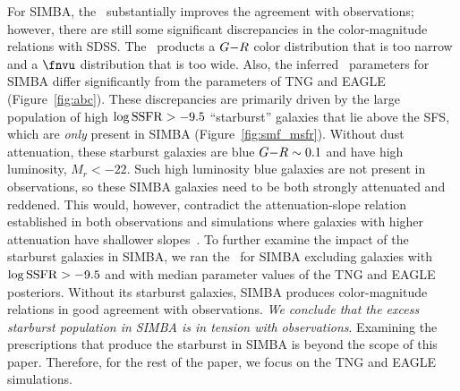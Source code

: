 For SIMBA, the \eda~substantially improves the agreement with observations;
however, there are still some significant discrepancies in the color-magnitude
relations with SDSS. The \eda~products a $G{-}R$ color distribution that is too
narrow and a $\fnvu$ distribution that is too wide. Also, the inferred \eda~parameters 
for SIMBA differ significantly from the parameters of TNG and EAGLE
(Figure~\ref{fig:abc}). These discrepancies are primarily driven by the
large population of high $\log{\rm SSFR} > -9.5$ ``starburst'' galaxies that
lie above the SFS, which are {\em only} present in SIMBA (Figure~\ref{fig:smf_msfr}). 
Without dust attenuation, these starburst galaxies are blue $G{-}R\sim0.1$ and
have high luminosity, $M_r < -22$. Such high luminosity blue galaxies are not
present in observations, so these SIMBA galaxies need to be both strongly 
attenuated and reddened. This would, however, contradict the attenuation-slope 
relation established in both observations and simulations where galaxies with 
higher attenuation have shallower
slopes~\citep{inoue2005,chevallard2013,salim2018,salim2020,trayford2020}.
To further examine the impact of the starburst galaxies in SIMBA, we ran the \eda~for SIMBA excluding galaxies with $\log{\rm SSFR} > -9.5$ and 
with median parameter values of the TNG and EAGLE posteriors. Without its starburst
galaxies, SIMBA produces color-magnitude relations in good agreement 
with observations. {\em We conclude that the excess starburst population in 
SIMBA is in tension with observations}. Examining the prescriptions that
produce the starburst in SIMBA is beyond the scope of this paper. Therefore,
for the rest of the paper, we focus on the TNG and EAGLE simulations.  

